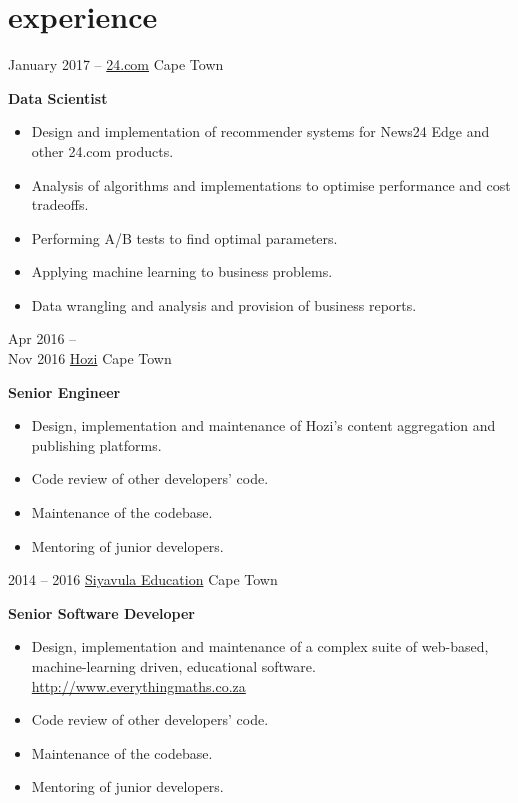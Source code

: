 \documentclass[]{friggeri-cv} %
\begin{document}
\section{experience}
\begin{entrylist}
  \entry
  {January 2017 -- }
  {\href{http://www.24.com}{24.com}}
  {Cape Town}
  {%
  \textbf{Data Scientist}
  \begin{itemize}
  \setlength{\itemsep}{5pt}
  \item Design and implementation of recommender systems for News24 Edge and other 24.com products.
  \item Analysis of algorithms and implementations to optimise performance and cost tradeoffs.
  \item Performing A/B tests to find optimal parameters.
  \item Applying machine learning to business problems.
  \item Data wrangling and analysis and provision of business reports.

  \end{itemize}
  }

  \entry
  {Apr 2016 -- \\Nov 2016}
  {\href{http://www.hozi.co.za}{Hozi}}
  {Cape Town}
  {%
  \textbf{Senior Engineer}
  \begin{itemize}
  \setlength{\itemsep}{5pt}
  \item Design, implementation and maintenance of Hozi's content aggregation and publishing platforms.
  \item Code review of other developers' code.
  \item Maintenance of the codebase.
  \item Mentoring of junior developers.
  \end{itemize}
}

\entry
{2014 -- 2016}
{\href{http://www.siyavula.com}{Siyavula Education}}
{Cape Town}
{%
\textbf{Senior Software Developer}
\begin{itemize}
\setlength{\itemsep}{5pt}
\item Design, implementation and maintenance of a complex suite of web-based, machine-learning driven, educational software.
\subitem \url{http://www.everythingmaths.co.za}
\item Code review of other developers' code.
\item Maintenance of the codebase.
\item Mentoring of junior developers.
\end{itemize}
}


\end{entrylist}
\end{document}
